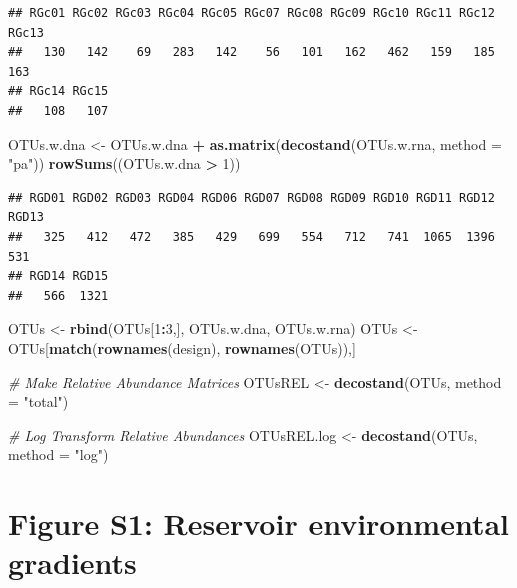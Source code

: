 \documentclass[]{article}
\newenvironment{Shaded}{\begin{snugshade}}{\end{snugshade}}
\newcommand{\CommentTok}[1]{\textcolor[rgb]{0.56,0.35,0.01}{\textit{#1}}}
\newcommand{\DataTypeTok}[1]{\textcolor[rgb]{0.13,0.29,0.53}{#1}}
\newcommand{\DecValTok}[1]{\textcolor[rgb]{0.00,0.00,0.81}{#1}}
\newcommand{\KeywordTok}[1]{\textcolor[rgb]{0.13,0.29,0.53}{\textbf{#1}}}
\newcommand{\NormalTok}[1]{#1}
\newcommand{\OperatorTok}[1]{\textcolor[rgb]{0.81,0.36,0.00}{\textbf{#1}}}
\newcommand{\StringTok}[1]{\textcolor[rgb]{0.31,0.60,0.02}{#1}}
\begin{document}
\begin{verbatim}
## RGc01 RGc02 RGc03 RGc04 RGc05 RGc07 RGc08 RGc09 RGc10 RGc11 RGc12 RGc13 
##   130   142    69   283   142    56   101   162   462   159   185   163 
## RGc14 RGc15 
##   108   107
\end{verbatim}

\begin{Shaded}
\begin{Highlighting}[]
\NormalTok{OTUs.w.dna <-}\StringTok{ }\NormalTok{OTUs.w.dna }\OperatorTok{+}\StringTok{ }\KeywordTok{as.matrix}\NormalTok{(}\KeywordTok{decostand}\NormalTok{(OTUs.w.rna, }\DataTypeTok{method =} \StringTok{"pa"}\NormalTok{))}
\KeywordTok{rowSums}\NormalTok{((OTUs.w.dna }\OperatorTok{>}\StringTok{ }\DecValTok{1}\NormalTok{))}
\end{Highlighting}
\end{Shaded}

\begin{verbatim}
## RGD01 RGD02 RGD03 RGD04 RGD06 RGD07 RGD08 RGD09 RGD10 RGD11 RGD12 RGD13 
##   325   412   472   385   429   699   554   712   741  1065  1396   531 
## RGD14 RGD15 
##   566  1321
\end{verbatim}

\begin{Shaded}
\begin{Highlighting}[]
\NormalTok{OTUs <-}\StringTok{ }\KeywordTok{rbind}\NormalTok{(OTUs[}\DecValTok{1}\OperatorTok{:}\DecValTok{3}\NormalTok{,],}
\NormalTok{              OTUs.w.dna,}
\NormalTok{              OTUs.w.rna)}
\NormalTok{OTUs <-}\StringTok{ }\NormalTok{OTUs[}\KeywordTok{match}\NormalTok{(}\KeywordTok{rownames}\NormalTok{(design), }\KeywordTok{rownames}\NormalTok{(OTUs)),]}

\CommentTok{# Make Relative Abundance Matrices}
\NormalTok{OTUsREL <-}\StringTok{ }\KeywordTok{decostand}\NormalTok{(OTUs, }\DataTypeTok{method =} \StringTok{"total"}\NormalTok{)}

\CommentTok{# Log Transform Relative Abundances}
\NormalTok{OTUsREL.log <-}\StringTok{ }\KeywordTok{decostand}\NormalTok{(OTUs, }\DataTypeTok{method =} \StringTok{"log"}\NormalTok{)}
\end{Highlighting}
\end{Shaded}

\hypertarget{figure-s1-reservoir-environmental-gradients}{%
\section{Figure S1: Reservoir environmental
gradients}\label{figure-s1-reservoir-environmental-gradients}}
\end{document}
